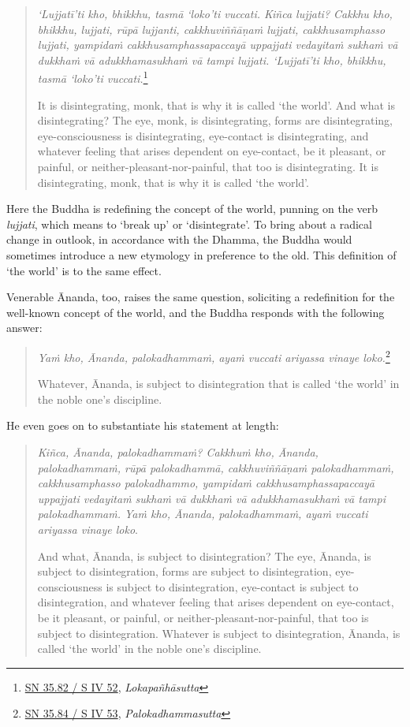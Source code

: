 \begin{quote}
\emph{`Lujjatī'ti kho, bhikkhu, tasmā `loko'ti vuccati. Kiñca lujjati? Cakkhu kho, bhikkhu, lujjati, rūpā lujjanti, cakkhuviññāṇaṁ lujjati, cakkhusamphasso lujjati, yampidaṁ cakkhusamphassapaccayā uppajjati vedayitaṁ sukhaṁ vā dukkhaṁ vā adukkhamasukhaṁ vā tampi lujjati. `Lujjatī'ti kho, bhikkhu, tasmā `loko'ti vuccati.}\footnote{\href{https://suttacentral.net/sn35.82/pli/ms}{SN 35.82 / S IV 52}, \emph{Lokapañhāsutta}}

It is disintegrating, monk, that is why it is called `the world'. And what is disintegrating? The eye, monk, is disintegrating, forms are disintegrating, eye-consciousness is disintegrating, eye-contact is disintegrating, and whatever feeling that arises dependent on eye-contact, be it pleasant, or painful, or neither-pleasant-nor-painful, that too is disintegrating. It is disintegrating, monk, that is why it is called `the world'.
\end{quote}

Here the Buddha is redefining the concept of the world, punning on the verb \emph{lujjati}, which means to `break up' or `disintegrate'. To bring about a radical change in outlook, in accordance with the Dhamma, the Buddha would sometimes introduce a new etymology in preference to the old. This definition of `the world' is to the same effect.

Venerable Ānanda, too, raises the same question, soliciting a redefinition for the well-known concept of the world, and the Buddha responds with the following answer:

\begin{quote}
\emph{Yaṁ kho, Ānanda, palokadhammaṁ, ayaṁ vuccati ariyassa vinaye loko.}\footnote{\href{https://suttacentral.net/sn35.84/pli/ms}{SN 35.84 / S IV 53}, \emph{Palokadhammasutta}}

Whatever, Ānanda, is subject to disintegration that is called `the world' in the noble one's discipline.
\end{quote}

He even goes on to substantiate his statement at length:

\begin{quote}
\emph{Kiñca, Ānanda, palokadhammaṁ? Cakkhuṁ kho, Ānanda, palokadhammaṁ, rūpā palokadhammā, cakkhuviññāṇaṁ palokadhammaṁ, cakkhusamphasso palokadhammo, yampidaṁ cakkhusamphassapaccayā uppajjati vedayitaṁ sukhaṁ vā dukkhaṁ vā adukkhamasukhaṁ vā tampi palokadhammaṁ. Yaṁ kho, Ānanda, palokadhammaṁ, ayaṁ vuccati ariyassa vinaye loko}.

And what, Ānanda, is subject to disintegration? The eye, Ānanda, is subject to disintegration, forms are subject to disintegration, eye-consciousness is subject to disintegration, eye-contact is subject to disintegration, and whatever feeling that arises dependent on eye-contact, be it pleasant, or painful, or neither-pleasant-nor-painful, that too is subject to disintegration. Whatever is subject to disintegration, Ānanda, is called `the world' in the noble one's discipline.
\end{quote}

